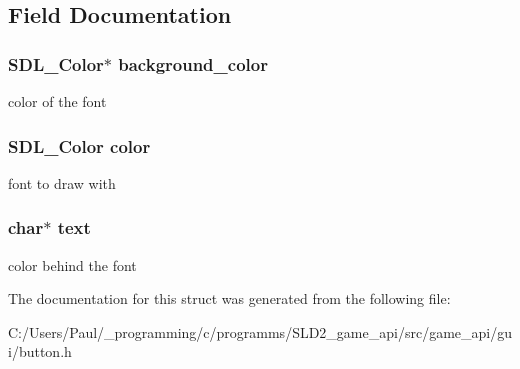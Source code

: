 \subsection{Field Documentation}
\hypertarget{struct___button___text___info_a32aa566db158516db085c8abc793cf33}{
\subsubsection[{background\+\_\+color}]{\setlength{\rightskip}{0pt plus 5cm}S\+D\+L\+\_\+\+Color$\ast$ background\+\_\+color}}\label{struct___button___text___info_a32aa566db158516db085c8abc793cf33}
color of the font \hypertarget{struct___button___text___info_a631bf4babe4c1825a2cdc0c19c2bd04f}{
\subsubsection[{color}]{\setlength{\rightskip}{0pt plus 5cm}S\+D\+L\+\_\+\+Color color}}\label{struct___button___text___info_a631bf4babe4c1825a2cdc0c19c2bd04f}
font to draw with \hypertarget{struct___button___text___info_a5633b1433389cec21ade3811bbe9ca5b}{
\subsubsection[{text}]{\setlength{\rightskip}{0pt plus 5cm}char$\ast$ text}}\label{struct___button___text___info_a5633b1433389cec21ade3811bbe9ca5b}
color behind the font 

The documentation for this struct was generated from the following file\+:\begin{DoxyCompactItemize}
\item 
C\+:/\+Users/\+Paul/\+\_\+programming/c/programms/\+S\+L\+D2\+\_\+game\+\_\+api/src/game\+\_\+api/gui/button.\+h\end{DoxyCompactItemize}
